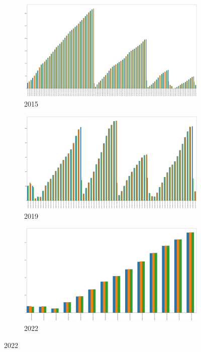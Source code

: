 \begin{figure}[h]
	\centering
	\caption{Before, after and daily BUI maximum value}
	\begin{subfigure}{0.45\textwidth}
		\centering
		\includegraphics[width=\textwidth]{graphs/2015/byHour/BUI_max_before_after.png}
		\caption{2015}
	\end{subfigure}
	\hfill
	\begin{subfigure}{0.45\textwidth}
		\centering
		\includegraphics[width=\textwidth]{graphs/2019/byHour/BUI_max_before_after.png}
		\caption{2019}
	\end{subfigure}
	\hfill
	\begin{subfigure}{0.45\textwidth}
		\centering
		\includegraphics[width=\textwidth]{graphs/2022/BUI_max_before_after.png}
		\caption{2022}
	\end{subfigure}
	\label{fig:daily_bui_after_before_max}
\end{figure}



